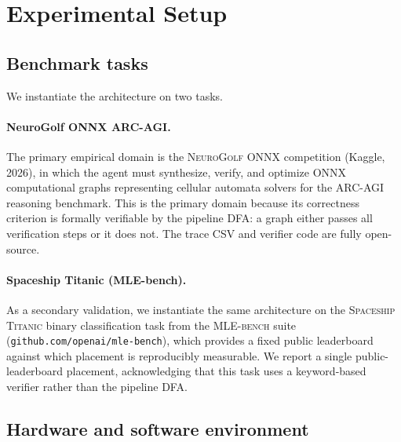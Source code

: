 \section{Experimental Setup}
\label{sec:expsetup}

\subsection{Benchmark tasks}

We instantiate the architecture on two tasks.

\paragraph{NeuroGolf ONNX ARC-AGI.}
The primary empirical domain is the \textsc{NeuroGolf ONNX}
competition (Kaggle, 2026), in which the agent must synthesize,
verify, and optimize ONNX computational graphs representing cellular
automata solvers for the ARC-AGI reasoning benchmark.  This is the
primary domain because its correctness criterion is formally
verifiable by the pipeline DFA: a graph either passes all
verification steps or it does not.  The trace CSV and verifier code
are fully open-source.

\paragraph{Spaceship Titanic (MLE-bench).}
As a secondary validation, we instantiate the same architecture on
the \textsc{Spaceship Titanic} binary classification task from the
\textsc{MLE-bench} suite
(\texttt{github.com/openai/mle-bench}), which provides a
fixed public leaderboard against which placement is reproducibly
measurable.  We report a single public-leaderboard placement,
acknowledging that this task uses a keyword-based verifier rather
than the pipeline DFA.

\subsection{Hardware and software environment}

